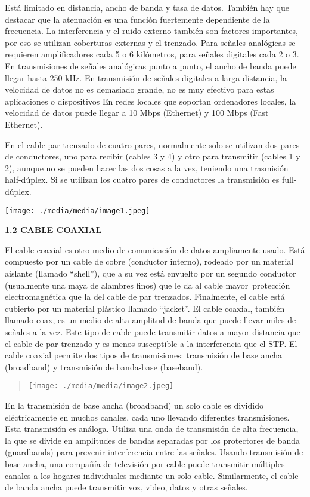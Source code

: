 Está limitado en distancia, ancho de banda y tasa de datos. También hay
que destacar que la atenuación es una función fuertemente dependiente de
la frecuencia. La interferencia y el ruido externo también son factores
importantes, por eso se utilizan coberturas externas y el trenzado. Para
señales analógicas se requieren amplificadores cada 5 o 6 kilómetros,
para señales digitales cada 2 o 3. En transmisiones de señales
analógicas punto a punto, el ancho de banda puede llegar hasta 250 kHz.
En transmisión de señales digitales a larga distancia, la velocidad de
datos no es demasiado grande, no es muy efectivo para estas aplicaciones
o dispositivos En redes locales que soportan ordenadores locales, la
velocidad de datos puede llegar a 10 Mbps (Ethernet) y 100 Mbps (Fast
Ethernet).

En el cable par trenzado de cuatro pares, normalmente solo se utilizan
dos pares de conductores, uno para recibir (cables 3 y 4) y otro para
transmitir (cables 1 y 2), aunque no se pueden hacer las dos cosas a la
vez, teniendo una trasmisión half-dúplex. Si se utilizan los cuatro
pares de conductores la transmisión es full-dúplex.

\texttt{[image: ./media/media/image1.jpeg]}

\textbf{1.2 CABLE COAXIAL}

El cable coaxial es otro medio de comunicación de datos ampliamente
usado. Está compuesto por un cable de cobre (conductor interno), rodeado
por un material aislante (llamado ``shell''), que a su vez está envuelto
por un segundo conductor (usualmente una maya de alambres finos) que le
da al cable mayor~protección electromagnética que la del cable de par
trenzados. Finalmente, el cable está cubierto por un material plástico
llamado ``jacket''. El cable coaxial, también llamado coax, es un medio
de alta amplitud de banda que puede llevar miles de señales a la vez.
Este tipo de cable puede transmitir datos a mayor distancia que el cable
de par trenzado y es menos susceptible a la interferencia que el STP. El
cable coaxial permite dos tipos de transmisiones: transmisión de base
ancha (broadband) y transmisión de banda-base (baseband).

\begin{quote}
\texttt{[image: ./media/media/image2.jpeg]}
\end{quote}

En la transmisión de base ancha (broadband) un solo cable es dividido
eléctricamente en muchos canales, cada uno llevando diferentes
transmisiones. Esta transmisión es análoga. Utiliza una onda de
transmisión de alta frecuencia, la que se divide en amplitudes de bandas
separadas por los protectores de banda (guardbands) para prevenir
interferencia entre las señales. Usando transmisión de base ancha, una
compañía de televisión por cable puede transmitir múltiples canales a
los hogares individuales mediante un solo cable. Similarmente, el cable
de banda ancha puede transmitir voz, video, datos y otras señales.

